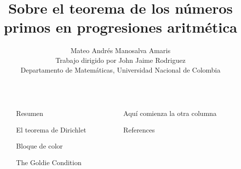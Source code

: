 \documentclass[final]{beamer}
\title{Sobre el teorema de los números primos en progresiones aritmética}
\author{Mateo Andrés Manosalva Amaris\\Trabajo dirigido por John Jaime Rodriguez\\Departamento de Matemáticas, Universidad Nacional de Colombia}
\newlength{\sepwidth}
\newlength{\colwidth}
\newcommand{\separatorcolumn}{\begin{column}{\sepwidth}\end{column}}
\begin{document}
\begin{frame}[t,fragile]
\begin{columns}[t]
\separatorcolumn

\begin{column}{\colwidth}

  \begin{block}{Resumen}

\lipsum[1]

  \end{block}

\begin{block}{El teorema de Dirichlet}
    \lipsum[2]
\end{block}
    
  \begin{alertblock}{Bloque de color}

    \lipsum[1-5] 
  \end{alertblock}

 \begin{block}{The Goldie Condition}
    \lipsum[1-4]
  \end{block}

\end{column}

\separatorcolumn

\begin{column}{\colwidth}
  \begin{block}{Aquí comienza la otra columna}
    \lipsum[1-4]
  \end{block}
  
  

 

  \begin{block}{References}

    \nocite{*}
    \footnotesize{}

  \end{block}

\end{column}
\separatorcolumn



\end{columns}
\end{frame}
\end{document}
